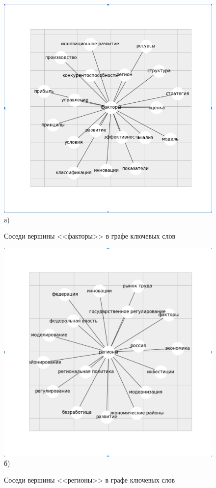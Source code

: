 \begin{figure}[ht]
  \begin{minipage}[ht]{0.49\linewidth}\centering
    \includegraphics[width=1.0\linewidth]{Dissertation/pics/factory_sim} \\ а)
    \caption{Соседи вершины <<факторы>> в графе ключевых слов}
  \end{minipage}
  \hfill
  \begin{minipage}[ht]{0.49\linewidth}\centering
    \includegraphics[width=1.0\linewidth]{Dissertation/pics/regiony_sim} \\ б)
    \caption{Соседи вершины <<регионы>> в графе ключевых слов}
  \end{minipage}
  \label{img:sim_1}
\end{figure}


